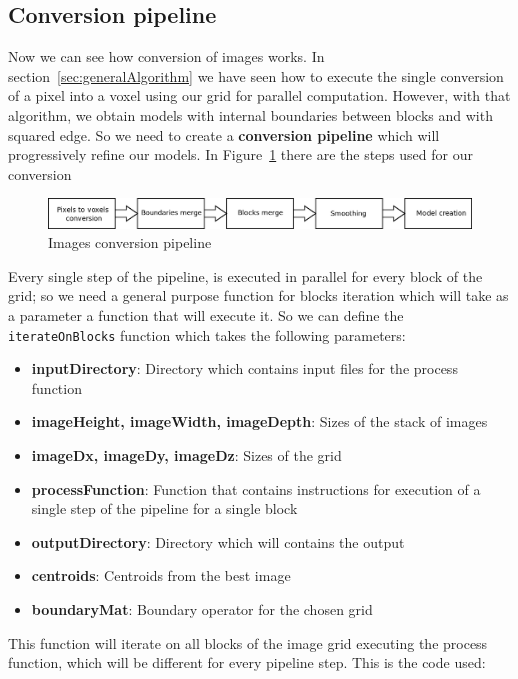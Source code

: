 \documentclass[11pt,oneside]{article}	%
\begin{document}
\subsection{Conversion pipeline}\label{sec:conversionpipeline}

Now we can see how conversion of images works. In section~\ref{sec:generalAlgorithm} we have seen how to execute the single conversion of a pixel into a voxel using our grid for parallel computation. However, with that algorithm, we obtain models with internal boundaries between blocks and with squared edge. So we need to create a \textbf{conversion pipeline} which will progressively refine our models. In Figure~\ref{fig:Pipeline} there are the steps used for our conversion

\begin{figure}[htb] %
   \centering
   \includegraphics[width=1.10\linewidth]{images/Pipeline.png}
   \caption{Images conversion pipeline}
   \label{fig:Pipeline}
\end{figure}

Every single step of the pipeline, is executed in parallel for every block of the grid; so we need a general purpose function for blocks iteration which will take as a parameter a function that will execute it. So we can define the \texttt{iterateOnBlocks} function which takes the following parameters:
\begin{itemize}
 \item \textbf{inputDirectory}: Directory which contains input files for the process function
 \item \textbf{imageHeight, imageWidth, imageDepth}: Sizes of the stack of images
 \item \textbf{imageDx, imageDy, imageDz}: Sizes of the grid
 \item \textbf{processFunction}: Function that contains instructions for execution of a single step of the pipeline for a single block
 \item \textbf{outputDirectory}: Directory which will contains the output
 \item \textbf{centroids}: Centroids from the best image
 \item \textbf{boundaryMat}: Boundary operator for the chosen grid
\end{itemize}

This function will iterate on all blocks of the image grid executing the process function, which will be different for every pipeline step. This is the code used:
\end{document}
